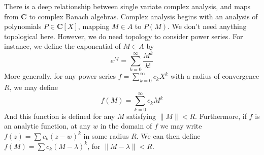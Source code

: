 There is a deep relationship between single variate complex analysis, and maps from $\mathbf{C}$ to complex Banach algebras. Complex analysis begins with an analysis of polynomials $P \in \mathbf{C}[X]$, mapping $M \in A$ to $P(M)$. We don't need anything topological here. However, we do need topology to consider power series. For instance, we define the exponential of $M \in A$ by
%
\[ e^M = \sum_{k = 0}^\infty \frac{M^k}{k!} \]
%
More generally, for any power series $f = \sum_{k = 0}^\infty c_k X^k$ with a radius of convergence $R$, we may define
%
\[ f(M) = \sum_{k = 0}^\infty c_k M^k \]
%
And this function is defined for any $M$ satisfying $\|M\| < R$. Furthermore, if $f$ is an analytic function, at any $w$ in the domain of $f$ we may write $f(z) = \sum c_k (z - w)^k$ in some radius $R$. We can then define $f(M) = \sum c_k (M - \lambda)^k$, for $\| M - \lambda \| < R$.